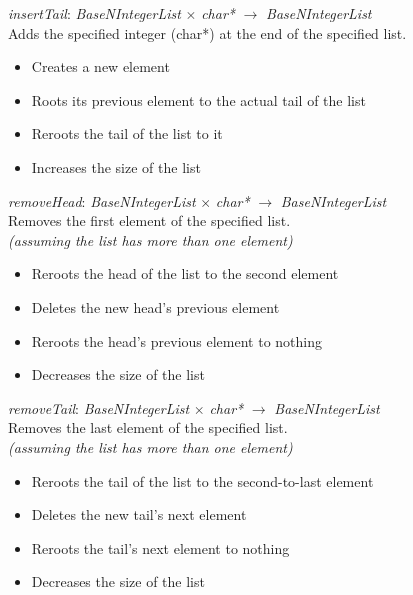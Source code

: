 \documentclass[book, backcover, english, nodocumentinfo]{upmethodology-document}
\begin{document}
		\begin{minipage}{\linewidth}
			\textit{insertTail}: \textit{BaseNIntegerList} $\times$ \textit{char*} $\rightarrow$ \textit{BaseNIntegerList}\\
			Adds the specified integer (char*) at the end of the specified list.\\
			\ov
			\begin{itemize}
				\item Creates a new element
				\item Roots its previous element to the actual tail of the list
				\item Reroots the tail of the list to it
				\item Increases the size of the list
			\end{itemize}
			\label{algo:BNIL-InsertTail}
			
		\end{minipage}
		\nxtalgo{}

		\begin{minipage}{\linewidth}
			\textit{removeHead}: \textit{BaseNIntegerList} $\times$ \textit{char*} $\rightarrow$ \textit{BaseNIntegerList}\\
			Removes the first element of the specified list.\\
			\ov \textit{ (assuming the list has more than one element)}
			\begin{itemize}
				\item Reroots the head of the list to the second element
				\item Deletes the new head's previous element
				\item Reroots the head's previous element to nothing
				\item Decreases the size of the list
			\end{itemize}
			\label{algo:BNIL-RemoveHead}
			
		\end{minipage}
		\nxtalgo{}

		\begin{minipage}{\linewidth}
			\textit{removeTail}: \textit{BaseNIntegerList} $\times$ \textit{char*} $\rightarrow$ \textit{BaseNIntegerList}\\
			Removes the last element of the specified list.\\
			\ov \textit{ (assuming the list has more than one element)}
			\begin{itemize}
				\item Reroots the tail of the list to the second-to-last element
				\item Deletes the new tail's next element
				\item Reroots the tail's next element to nothing
				\item Decreases the size of the list
			\end{itemize}
			\label{algo:BNIL-RemoveTail}
			
		\end{minipage}
		\nxtalgo{}
\end{document}
